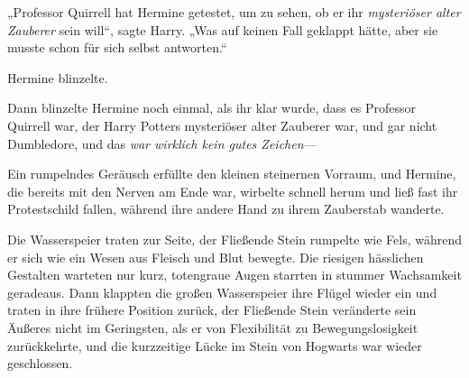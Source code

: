 „Professor Quirrell hat Hermine getestet, um zu sehen, ob er ihr \emph{mysteriöser alter Zauberer} sein will“, sagte Harry. „Was auf keinen Fall geklappt hätte, aber sie musste schon für sich selbst antworten.“

Hermine blinzelte.

Dann blinzelte Hermine noch einmal, als ihr klar wurde, dass es Professor Quirrell war, der Harry Potters mysteriöser alter Zauberer war, und gar nicht Dumbledore, und das \emph{war wirklich kein gutes Zeichen}—

Ein rumpelndes Geräusch erfüllte den kleinen steinernen Vorraum, und Hermine, die bereits mit den Nerven am Ende war, wirbelte schnell herum und ließ fast ihr Protestschild fallen, während ihre andere Hand zu ihrem Zauberstab wanderte.

Die Wasserspeier traten zur Seite, der Fließende Stein rumpelte wie Fels, während er sich wie ein Wesen aus Fleisch und Blut bewegte. Die riesigen hässlichen Gestalten warteten nur kurz, totengraue Augen starrten in stummer Wachsamkeit geradeaus. Dann klappten die großen Wasserspeier ihre Flügel wieder ein und traten in ihre frühere Position zurück, der Fließende Stein veränderte sein Äußeres nicht im Geringsten, als er von Flexibilität zu Bewegungslosigkeit zurückkehrte, und die kurzzeitige Lücke im Stein von Hogwarts war wieder geschlossen.

